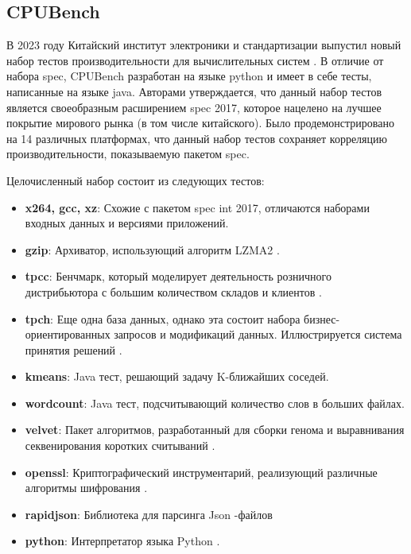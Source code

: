 \subsection{CPUBench}

В 2023 году Китайский институт электроники и стандартизации выпустил новый набор тестов производительности для вычислительных систем \cite{lu2023cpubench}. В отличие от набора spec, CPUBench разработан на языке python и имеет в себе тесты, написанные на языке java. Авторами утверждается, что данный набор тестов является своеобразным расширением spec 2017, которое нацелено на лучшее покрытие мирового рынка (в том числе китайского). Было продемонстрировано на 14 различных платформах, что данный набор тестов сохраняет корреляцию производительности, показываемую пакетом spec.

Целочисленный набор состоит из следующих тестов:
\begin{itemize}
	\item  \textbf{x264, gcc, xz}: Схожие с пакетом spec int 2017, отличаются наборами входных данных и версиями приложений.
	\item  \textbf{gzip}: Архиватор, использующий алгоритм LZMA2 \cite{akoguz2016comparison}.
	\item  \textbf{tpcc}: Бенчмарк, который моделирует  деятельность розничного дистрибьютора с большим количеством складов и клиентов \cite{leutenegger1993modeling}.
	\item  \textbf{tpch}: Еще одна база данных, однако эта состоит набора бизнес-ориентированных запросов и модификаций данных. Иллюстрируется система принятия решений \cite{barata2015overview}.
	\item  \textbf{kmeans}: Java тест, решающий задачу K-ближайших соседей.
	\item  \textbf{wordcount}: Java тест, подсчитывающий количество слов в больших файлах. 
	\item  \textbf{velvet}: Пакет алгоритмов, разработанный для сборки генома и выравнивания секвенирования коротких считываний \cite{zerbino2008velvet}. 
	\item  \textbf{openssl}: Криптографический инструментарий, реализующий различные алгоритмы шифрования \cite{rescorla2001introduction}.
	\item  \textbf{rapidjson}: Библиотека для парсинга Json -файлов\cite{keiser2023demand}
	\item  \textbf{python}: Интерпретатор языка Python \cite{python2021python}.
\end{itemize}


